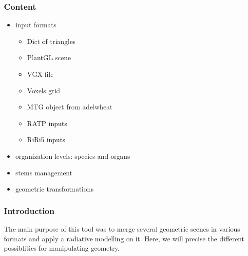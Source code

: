 \documentclass[letterpaper,10pt,english]{sphinxmanual}
\begin{document}
\subsubsection{Content}
\label{\detokenize{input_scenes:Content}}\begin{itemize}
\item {} 
\sphinxAtStartPar
input formats
\begin{itemize}
\item {} 
\sphinxAtStartPar
Dict of triangles

\item {} 
\sphinxAtStartPar
PlantGL scene

\item {} 
\sphinxAtStartPar
VGX file

\item {} 
\sphinxAtStartPar
Voxels grid

\item {} 
\sphinxAtStartPar
MTG object from adelwheat

\item {} 
\sphinxAtStartPar
RATP inputs

\item {} 
\sphinxAtStartPar
RiRi5 inputs

\end{itemize}

\item {} 
\sphinxAtStartPar
organization levels: species and organs

\item {} 
\sphinxAtStartPar
stems management

\item {} 
\sphinxAtStartPar
geometric transformations

\end{itemize}


\subsubsection{Introduction}
\label{\detokenize{input_scenes:Introduction}}
\sphinxAtStartPar
The main purpose of this tool was to merge several geometric scenes in various formats and apply a radiative modelling on it. Here, we will precise the different possiblities for manipulating geometry.
\end{document}
